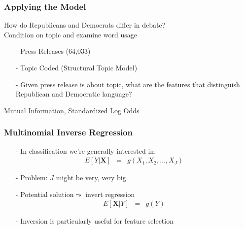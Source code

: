 \documentclass{beamer}
\numberwithin{equation}{section}
\begin{document}
\begin{frame}
\frametitle{Applying the Model}


How do Republicans and Democrats differ in debate?\\

Condition on \alert{topic} and examine word usage\\

\begin{itemize}
\item[-] Press Releases (64,033)
\item[-] Topic Coded (Structural Topic Model)
\item[-] Given press release is about topic, what are the features that distinguish Republican and Democratic language?
\end{itemize}



\end{frame}
\begin{frame}

Mutual Information, Standardized Log Odds
\begin{center}
\end{center}


\end{frame}


\begin{frame}
\frametitle{Multinomial Inverse Regression}

\begin{itemize}
\item[-] In classification we're generally interested in:
\begin{eqnarray}
E[Y| \boldsymbol{X}] & = & g(X_{1}, X_{2}, \hdots, X_{J}) \nonumber 
\end{eqnarray}
\item[-] Problem: $J$ might be very, very big.  
\item[-] Potential solution$\leadsto$ invert regression
\begin{eqnarray}
E[\boldsymbol{X}|Y] & = & g(Y) \nonumber 
\end{eqnarray}
\item[-] Inversion is particularly useful for \alert{feature selection}
\end{itemize}

\end{frame}
\end{document}

